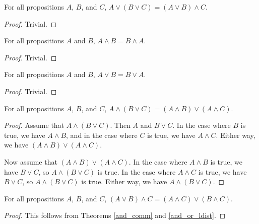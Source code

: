 \documentclass[../math.tex]{subfiles}
\begin{document}
\begin{theorem} \label{or_assoc}
    For all propositions $A$, $B$, and $C$, $A \vee (B \vee C) = (A \vee B)
    \wedge C$.
\end{theorem}
\begin{proof}
    Trivial.
\end{proof}

\begin{theorem} \label{and_comm}
    For all propositions $A$ and $B$, $A \wedge B = B \wedge A$.
\end{theorem}
\begin{proof}
    Trivial.
\end{proof}

\begin{theorem} \label{or_comm}
    For all propositions $A$ and $B$, $A \vee B = B \vee A$.
\end{theorem}
\begin{proof}
    Trivial.
\end{proof}

\begin{theorem} \label{and_or_ldist}
    For all propositions $A$, $B$, and $C$, $A \wedge (B \vee C) = (A \wedge B)
    \vee (A \wedge C)$.
\end{theorem}
\begin{proof}
    Assume that $A \wedge (B \vee C)$.  Then $A$ and $B \vee C$.  In the case
    where $B$ is true, we have $A \wedge B$, and in the case where $C$ is true,
    we have $A \wedge C$.  Either way, we have $(A \wedge B) \vee (A \wedge C)$.

    Now assume that $(A \wedge B) \vee (A \wedge C)$.  In the case where $A
    \wedge B$ is true, we have $B \vee C$, so $A \wedge (B \vee C)$ is true.  In
    the case where $A \wedge C$ is true, we have $B \vee C$, so $A \wedge (B
    \vee C)$ is true.  Either way, we have $A \wedge (B \vee C)$.
\end{proof}

\begin{theorem} \label{and_or_rdist}
    For all propositions $A$, $B$, and $C$, $(A \vee B) \wedge C = (A \wedge C)
    \vee (B \wedge C)$.
\end{theorem}
\begin{proof}
    This follows from Theorems \ref{and_comm} and \ref{and_or_ldist}.
\end{proof}
\end{document}
